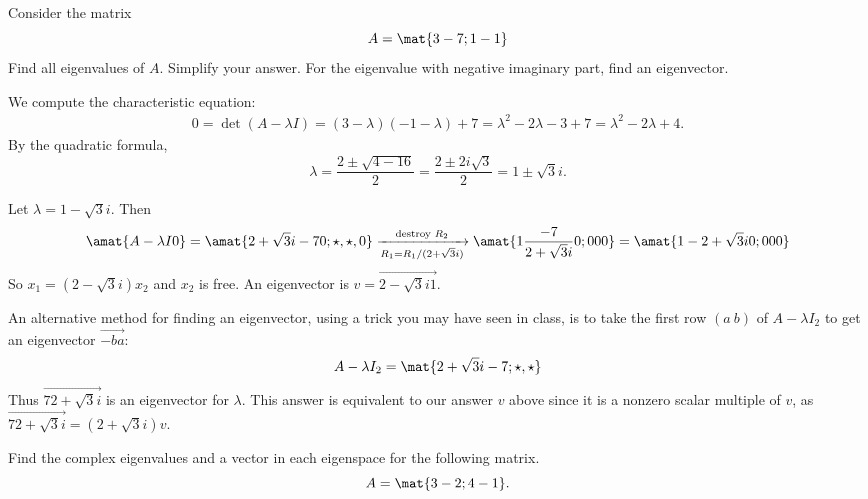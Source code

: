 \begin{problems}
\problem %
 Consider the matrix
  \[ A = \mat{3 -7; 1 -1} \]
 Find all eigenvalues of $A$.  Simplify your answer.
 For the eigenvalue with negative imaginary part, find an eigenvector.

 \begin{solution}
We compute the characteristic equation:
    \[\begin{split}
        0= \det(A-\lambda I)=(3-\lambda)(-1-\lambda)+7=
        \lambda^2-2\lambda-3+7 = \lambda^2-2\lambda+4.
    \end{split} \]
    By the quadratic formula,
    \[ \lambda = \frac{2\pm\sqrt{4-16}}2 = \dfrac{2 \pm 2i\sqrt{3}}{2}= 1 \pm
      \sqrt{3}i.\]

  Let $\lambda = 1-\sqrt{3}i$.  Then
  \[\amat{A-\lambda I 0} = \amat{2+\sqrt{3}i  -7 0; \star, \star, 0}
    \xrightarrow[R_1 = R_1/(2+\sqrt{3}i)]{\textup{destroy
        $R_2$}} \amat{1 \frac{-7}{2+\sqrt{3}i} 0; 0 0 0} =\amat{1 -2+\sqrt{3}i
      0; 0 0 0}
  \]
  So $x_1 = (2-\sqrt{3}i)x_2$ and $x_2$ is free. An eigenvector is
  $v= \vec{2-\sqrt{3}i 1}$.
  
  
  
  An alternative method for finding an eigenvector, using a trick you may have
  seen in class, is to take the first row $(a \ b)$ of $A-\lambda I_2$ to get an
  eigenvector $\vec{-b a}$:
  \[ A - \lambda I_2 = \mat{2+\sqrt{3}i -7; \star, \star}\] Thus
  $\vec{7 2+\sqrt{3}i}$ is an eigenvector for $\lambda$. This answer is
  equivalent to our answer $v$ above since it is a nonzero scalar multiple of
  $v$, as $\vec{7 2+\sqrt{3}i} = (2+\sqrt{3}i)v$.
 \end{solution}

 \problem %
 Find the complex eigenvalues and a vector in each eigenspace for the following
 matrix.
\[A = \mat{3 -2; 4 -1}.\]


\end{problems}
